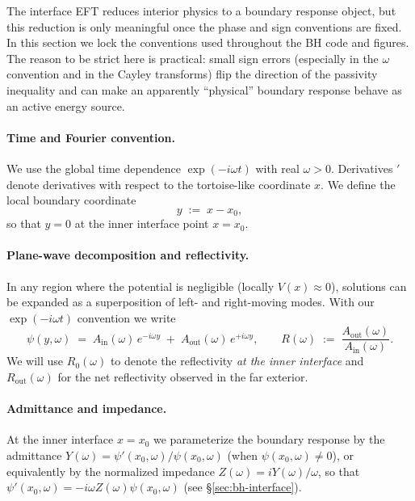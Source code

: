 
The interface EFT reduces interior physics to a boundary response object, but this reduction is only meaningful once the phase and sign conventions are fixed. In this section we lock the conventions used throughout the BH code and figures. The reason to be strict here is practical: small sign errors (especially in the $\omega$ convention and in the Cayley transforms) flip the direction of the passivity inequality and can make an apparently ``physical'' boundary response behave as an active energy source.

\paragraph{Time and Fourier convention.}
We use the global time dependence $\exp(-i\omega t)$ with real $\omega>0$.
Derivatives ${}'$ denote derivatives with respect to the tortoise-like coordinate $x$.
We define the local boundary coordinate
\[
  y \;:=\; x - x_0,
\]
so that $y=0$ at the inner interface point $x=x_0$.

\paragraph{Plane-wave decomposition and reflectivity.}
In any region where the potential is negligible (locally $V(x)\approx 0$), solutions can be expanded as a superposition of left- and right-moving modes. With our $\exp(-i\omega t)$ convention we write
\begin{equation}
  \psi(y,\omega) \;=\; A_{\mathrm{in}}(\omega)\,e^{-i\omega y} \; + \; A_{\mathrm{out}}(\omega)\,e^{+i\omega y},
  \qquad
  R(\omega) \;:=\; \frac{A_{\mathrm{out}}(\omega)}{A_{\mathrm{in}}(\omega)}.
  \label{eq:bh-decomp}
\end{equation}
We will use $R_0(\omega)$ to denote the reflectivity \emph{at the inner interface} and $R_{\mathrm{out}}(\omega)$ for the net reflectivity observed in the far exterior.

\paragraph{Admittance and impedance.}
At the inner interface $x=x_0$ we parameterize the boundary response by the admittance
$Y(\omega)=\psi'(x_0,\omega)/\psi(x_0,\omega)$ (when $\psi(x_0,\omega)\neq 0$),
or equivalently by the normalized impedance $Z(\omega)= iY(\omega)/\omega$, so that
$\psi'(x_0,\omega) = -i\omega Z(\omega)\psi(x_0,\omega)$ (see \S\ref{sec:bh-interface}).


